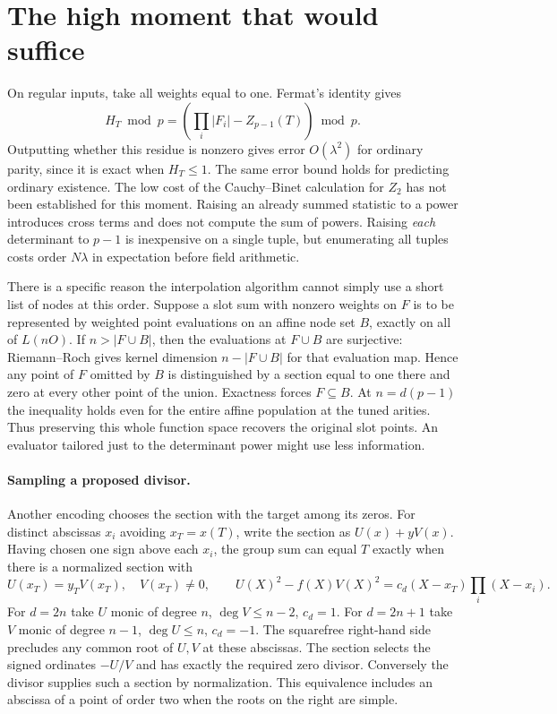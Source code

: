 \documentclass[11pt]{article}
\begin{document}
\section{The high moment that would suffice}

On regular inputs, take all weights equal to one. Fermat's identity gives
\[
 H_T\bmod p=\left(\prod_i |F_i|-Z_{p-1}(T)\right)\bmod p .
\]
Outputting whether this residue is nonzero gives error $O(\lambda^2)$
for ordinary parity, since it is exact when $H_T\le1$. The same error
bound holds for predicting ordinary existence. The low cost of the
Cauchy--Binet calculation for $Z_2$ has not been established for this
moment. Raising an already summed statistic to a power introduces cross
terms and does not compute the sum of powers. Raising \emph{each}
determinant to $p-1$ is inexpensive on a single tuple, but enumerating
all tuples costs order $N\lambda$ in expectation before field arithmetic.

There is a specific reason the interpolation algorithm cannot simply
use a short list of nodes at this order. Suppose a slot sum with nonzero
weights on $F$ is to be represented by weighted point evaluations on
an affine node set $B$, exactly on all of $L(nO)$. If
$n>|F\cup B|$, then the evaluations at $F\cup B$ are surjective:
Riemann--Roch gives kernel dimension $n-|F\cup B|$ for that evaluation
map. Hence any point of $F$ omitted by $B$ is distinguished by a section
equal to one there and zero at every other point of the union. Exactness
forces $F\subseteq B$. At $n=d(p-1)$ the inequality holds even for the
entire affine population at the tuned arities. Thus preserving this
whole function space recovers the original slot points. An evaluator
tailored just to the determinant power might use less information.

\paragraph{Sampling a proposed divisor.}
Another encoding chooses the section with the target among its zeros.
For distinct abscissas $x_i$ avoiding $x_T=x(T)$, write the section as
$U(x)+yV(x)$. Having chosen one sign above each $x_i$, the group sum
can equal $T$ exactly when there is a normalized section with
\[
 U(x_T)=y_TV(x_T),\quad V(x_T)\ne0,\qquad
 U(X)^2-f(X)V(X)^2=c_d(X-x_T)\prod_i(X-x_i).
\]
For $d=2n$ take $U$ monic of degree $n$, $\deg V\le n-2$, $c_d=1$.
For $d=2n+1$ take $V$ monic of degree $n-1$, $\deg U\le n$, $c_d=-1$.
The squarefree right-hand side precludes any common root of $U,V$ at
these abscissas. The section selects the signed ordinates $-U/V$ and has
exactly the required zero divisor. Conversely the divisor supplies such a
section by normalization. This equivalence includes an abscissa of a
point of order two when the roots on the right are simple.
\end{document}
